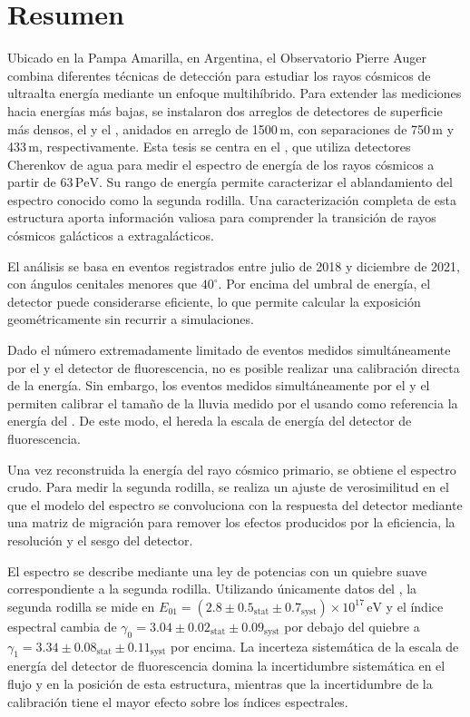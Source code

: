 
\chapter*{Resumen}
\vspace{-2\baselineskip}

Ubicado en la Pampa Amarilla, en Argentina, el Observatorio Pierre Auger combina diferentes técnicas de detección para estudiar los rayos cósmicos de ultraalta energía mediante un enfoque multihíbrido.
Para extender las mediciones hacia energías más bajas, se instalaron dos arreglos de detectores de superficie más densos, el  y el , anidados en arreglo de 1500\,m, con separaciones de 750\,m y 433\,m, respectivamente.
Esta tesis se centra en el , que utiliza detectores Cherenkov de agua para medir el espectro de energía de los rayos cósmicos a partir de $63\,\mathrm{PeV}$.
Su rango de energía permite caracterizar el ablandamiento del espectro conocido como la segunda rodilla.
Una caracterización completa de esta estructura aporta información valiosa para comprender la transición de rayos cósmicos galácticos a extragalácticos.

El análisis se basa en \SDFourThreeThreeNEvents{} eventos registrados entre julio de 2018 y diciembre de 2021, con ángulos cenitales menores que $40^\circ$.
Por encima del umbral de energía, el detector puede considerarse eficiente, lo que permite calcular la exposición geométricamente sin recurrir a simulaciones.

Dado el número extremadamente limitado de eventos medidos simultáneamente por el  y el detector de fluorescencia, no es posible realizar una calibración directa de la energía.
Sin embargo, los eventos medidos simultáneamente por el  y el  permiten calibrar el tamaño de la lluvia medido por el  usando como referencia la energía del .
De este modo, el  hereda la escala de energía del detector de fluorescencia.


Una vez reconstruida la energía del rayo cósmico primario, se obtiene el espectro crudo.
Para medir la segunda rodilla, se realiza un ajuste de verosimilitud en el que el modelo del espectro se convoluciona con la respuesta del detector mediante una matriz de migración para remover los efectos producidos por la eficiencia, la resolución y el sesgo del detector.

El espectro se describe mediante una ley de potencias con un quiebre suave correspondiente a la segunda rodilla.
Utilizando únicamente datos del , la segunda rodilla se mide en $E_{01}=(2.8\pm0.5_{\mathrm{stat}}\pm0.7_{\mathrm{syst}})\times10^{17}\,\mathrm{eV}$ y el índice espectral cambia de $\gamma_0=3.04\pm0.02_{\mathrm{stat}}\pm0.09_{\mathrm{syst}}$ por debajo del quiebre a $\gamma_1=3.34\pm0.08_{\mathrm{stat}}\pm0.11_{\mathrm{syst}}$ por encima.
La incerteza sistemática de la escala de energía del detector de fluorescencia domina la incertidumbre sistemática en el flujo y en la posición de esta estructura, mientras que la incertidumbre de la calibración tiene el mayor efecto sobre los índices espectrales.

